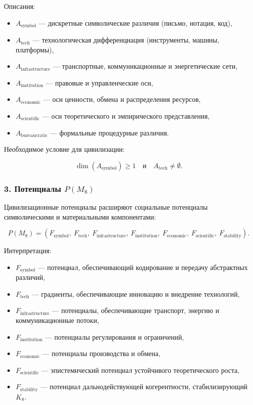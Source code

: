 Описания:

\begin{itemize}
    \item $A_{\mathrm{symbol}}$ — дискретные символические различия (письмо, нотация, код),
    \item $A_{\mathrm{tech}}$ — технологическая дифференциация (инструменты, машины, платформы),
    \item $A_{\mathrm{infrastructure}}$ — транспортные, коммуникационные и энергетические сети,
    \item $A_{\mathrm{institution}}$ — правовые и управленческие оси,
    \item $A_{\mathrm{economic}}$ — оси ценности, обмена и распределения ресурсов,
    \item $A_{\mathrm{scientific}}$ — оси теоретического и эмпирического представления,
    \item $A_{\mathrm{bureaucratic}}$ — формальные процедурные различия.
\end{itemize}

Необходимое условие для цивилизации:

\[
\dim(A_{\mathrm{symbol}}) \ge 1
\quad\text{и}\quad
A_{\mathrm{tech}}\neq\emptyset.
\]

\subsubsection*{3. Потенциалы \texorpdfstring{$P(M_8)$}{P(M_8)}}

Цивилизационные потенциалы расширяют социальные потенциалы символическими и материальными компонентами:

\[
P(M_8)=
(F_{\mathrm{symbol}},\
F_{\mathrm{tech}},\
F_{\mathrm{infrastructure}},\
F_{\mathrm{institution}},\
F_{\mathrm{economic}},\
F_{\mathrm{scientific}},\
F_{\mathrm{stability}}).
\]

Интерпретация:

\begin{itemize}
    \item $F_{\mathrm{symbol}}$ — потенциал, обеспечивающий кодирование и передачу абстрактных различий,
    \item $F_{\mathrm{tech}}$ — градиенты, обеспечивающие инновацию и внедрение технологий,
    \item $F_{\mathrm{infrastructure}}$ — потенциалы, обеспечивающие транспорт, энергию и коммуникационные потоки,
    \item $F_{\mathrm{institution}}$ — потенциалы регулирования и ограничений,
    \item $F_{\mathrm{economic}}$ — потенциалы производства и обмена,
    \item $F_{\mathrm{scientific}}$ — эпистемический потенциал устойчивого теоретического роста,
    \item $F_{\mathrm{stability}}$ — потенциал дальнодействующей когерентности, стабилизирующий $K_8$.
\end{itemize}

